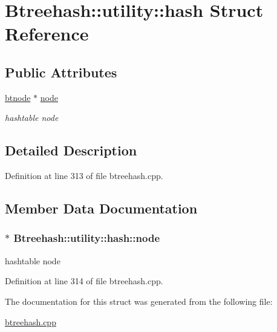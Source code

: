 \hypertarget{struct_btreehash_1_1utility_1_1hash}{\section{Btreehash\-:\-:utility\-:\-:hash Struct Reference}
\label{struct_btreehash_1_1utility_1_1hash}
}
\subsection*{Public Attributes}
\begin{DoxyCompactItemize}
\item 
\hyperlink{namespace_btreehash_ac7db8bb3c794c446de540bf6a03955bc}{btnode} $\ast$ \hyperlink{struct_btreehash_1_1utility_1_1hash_a1fc87787f4feb23300ebccfcd5b9b11c}{node}
\begin{DoxyCompactList}\small\item\em hashtable node \end{DoxyCompactList}\end{DoxyCompactItemize}


\subsection{Detailed Description}


Definition at line 313 of file btreehash.\-cpp.



\subsection{Member Data Documentation}
\hypertarget{struct_btreehash_1_1utility_1_1hash_a1fc87787f4feb23300ebccfcd5b9b11c}{
\subsubsection[{node}]{$\ast$ Btreehash\-::utility\-::hash\-::node}}\label{struct_btreehash_1_1utility_1_1hash_a1fc87787f4feb23300ebccfcd5b9b11c}


hashtable node 



Definition at line 314 of file btreehash.\-cpp.



The documentation for this struct was generated from the following file\-:\begin{DoxyCompactItemize}
\item 
\hyperlink{btreehash_8cpp}{btreehash.\-cpp}\end{DoxyCompactItemize}
